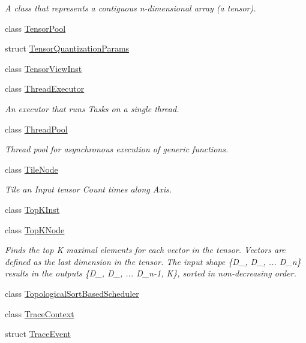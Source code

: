 \begin{DoxyCompactItemize}
\begin{DoxyCompactList}\small\item\em A class that represents a contiguous n-\/dimensional array (a tensor). \end{DoxyCompactList}\item 
class \hyperlink{classglow_1_1_tensor_pool}{Tensor\+Pool}
\item 
struct \hyperlink{structglow_1_1_tensor_quantization_params}{Tensor\+Quantization\+Params}
\item 
class \hyperlink{classglow_1_1_tensor_view_inst}{Tensor\+View\+Inst}
\item 
class \hyperlink{classglow_1_1_thread_executor}{Thread\+Executor}
\begin{DoxyCompactList}\small\item\em An executor that runs Tasks on a single thread. \end{DoxyCompactList}\item 
class \hyperlink{classglow_1_1_thread_pool}{Thread\+Pool}
\begin{DoxyCompactList}\small\item\em Thread pool for asynchronous execution of generic functions. \end{DoxyCompactList}\item 
class \hyperlink{classglow_1_1_tile_node}{Tile\+Node}
\begin{DoxyCompactList}\small\item\em Tile an Input tensor Count times along Axis. \end{DoxyCompactList}\item 
class \hyperlink{classglow_1_1_top_k_inst}{Top\+K\+Inst}
\item 
class \hyperlink{classglow_1_1_top_k_node}{Top\+K\+Node}
\begin{DoxyCompactList}\small\item\em Finds the top K maximal elements for each vector in the tensor. Vectors are defined as the last dimension in the tensor. The input shape \{D\+\_, D\+\_, ... D\+\_\+n\} results in the outputs \{D\+\_, D\+\_, ... D\+\_\+n-\/1, K\}, sorted in non-\/decreasing order. \end{DoxyCompactList}\item 
class \hyperlink{classglow_1_1_topological_sort_based_scheduler}{Topological\+Sort\+Based\+Scheduler}
\item 
class \hyperlink{classglow_1_1_trace_context}{Trace\+Context}
\item 
struct \hyperlink{structglow_1_1_trace_event}{Trace\+Event}

\end{DoxyCompactItemize}

